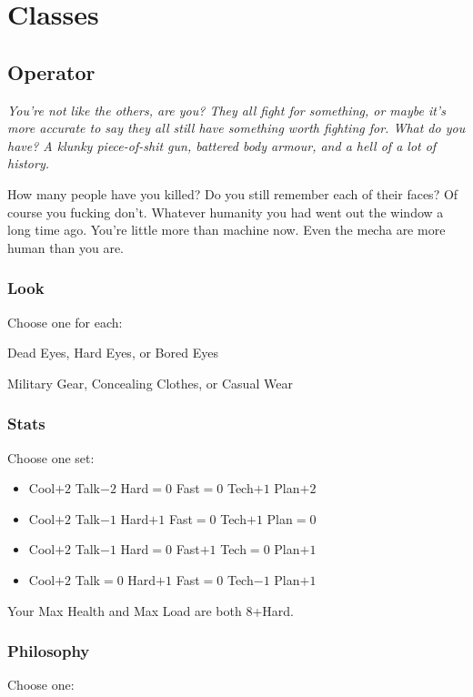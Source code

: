 \section{Classes}


\subsection{Operator}
{\itshape You're not like the others, are you? They all fight for
  something, or maybe it's more accurate to say they all still have
  something worth fighting for. What do you have? A klunky
  piece-of-shit gun, battered body armour, and a hell of a lot of
  history.

How many people have you killed? Do you still remember each of their
faces? Of course you fucking don't. Whatever humanity you had went out
the window a long time ago. You're little more than machine now. Even
the mecha are more human than you are.}

\subsubsection{Look}

Choose one for each:

Dead Eyes, Hard Eyes, or Bored Eyes

Military Gear, Concealing Clothes, or Casual Wear

\subsubsection{Stats}
Choose one set:
\begin{itemize}
\setlength\itemsep{0em}
\item Cool$+2$ Talk$-2$ Hard${=}0$ Fast${=}0$ Tech$+1$ Plan$+2$
\item Cool$+2$ Talk$-1$ Hard$+1$ Fast${=}0$ Tech$+1$ Plan${=}0$
\item Cool$+2$ Talk$-1$ Hard${=}0$ Fast$+1$ Tech${=}0$ Plan$+1$
\item Cool$+2$ Talk${=}0$ Hard$+1$ Fast${=}0$ Tech$-1$ Plan$+1$
\end{itemize}

Your Max Health and Max Load are both 8+Hard.

\subsubsection{Philosophy}
Choose one:
